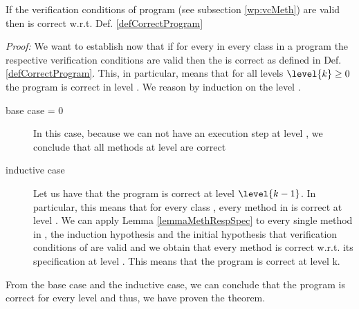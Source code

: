 \begin{vcGenCorrect1}
 If the verification conditions  of program \Program{} (see  subsection \ref{wp:vcMeth})
are valid then \Program{} is correct w.r.t. Def. \ref{defCorrectProgram}
\end{vcGenCorrect1}
\textit{Proof:}
We want to establish now  that if for every \methodd{}
 in every class \class{} in a program \Program{}  the respective verification conditions are valid then 
the \Program{} is correct as defined in Def. \ref{defCorrectProgram}.
 This, in particular, means that for all levels $\level{k} \ge 0 $ the program is correct in  level .
We reason by induction on the level . 
\begin{description} 
\item[base case  = 0]
 In this case, because we can not have an execution step at level , we conclude that all methods at level  
are correct
\item[inductive case ] Let us have that the program is correct at level $\level{k-1}$. 
In particular, this means that for every class \class{}, every method \methodd{} in \class{} is correct at level .
We can apply Lemma \ref{lemmaMethRespSpec} to every single method  \methodd{} in \Program{}, 
 the induction hypothesis  and the initial hypothesis that  verification conditions  of \methodd{} are valid and we obtain that 
every method  \methodd{} is correct w.r.t. its specification at level . This means that the program is correct at level k. 
\end{description}
From the base case and the inductive case, we can conclude that the program \Program{} is correct for every level  
and thus, we have proven the theorem.
 
\Qed







